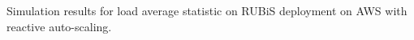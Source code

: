 \label{stratos} Simulation results for load average statistic on RUBiS deployment on AWS with reactive auto-scaling.